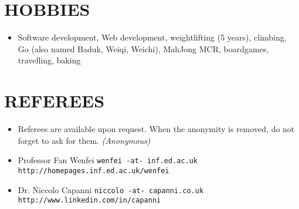 \documentclass{res}
\begin{document}
\begin{resume}
\section{HOBBIES}         
        \begin{itemize}
                \item[] Software development, Web development, weightlifting (5 years), climbing, Go (also named Baduk, Weiqi, Weichi), MahJong MCR, boardgames, travelling, baking
        \end{itemize}

\section{REFEREES}
\ifisanon 
     \begin{itemize}
         \item[] Referees are available upon request. When the anonymity is removed, do not forget to ask for them. \textit{(Anonymous)}
     \end{itemize}
\else
                \begin{itemize}
                        \item[] Professor Fan Wenfei \tabto{5cm} \texttt{wenfei -at- inf.ed.ac.uk} \hfill \texttt{http://homepages.inf.ed.ac.uk/wenfei}
                        \item[] Dr. Niccolo Capanni \tabto{5cm} \texttt{niccolo -at- capanni.co.uk} \hfill \texttt{http://www.linkedin.com/in/capanni}
                \end{itemize}
\fi
\end{resume} 
\end{document}
